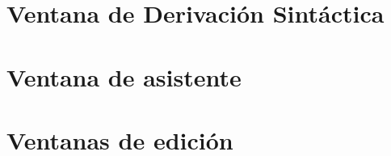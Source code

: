  \section{Ventana de Derivación Sintáctica}



\section{Ventana de asistente}





\section{Ventanas de edición}

